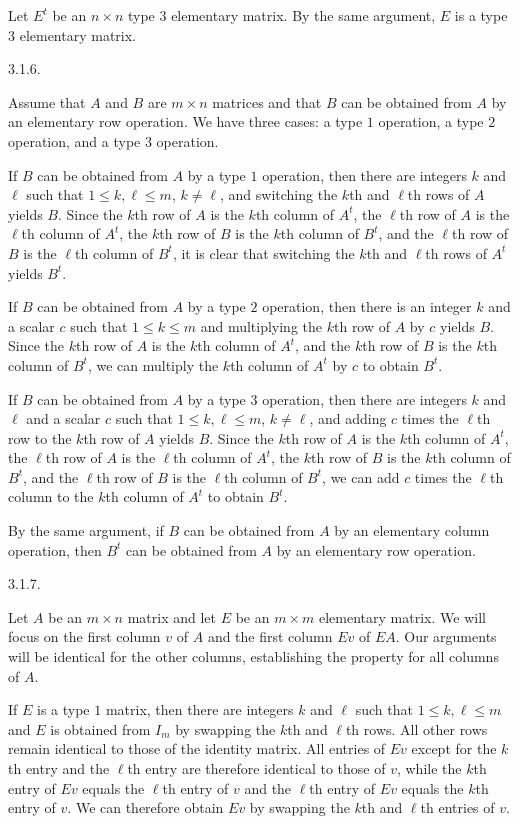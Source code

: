 Let $E^t$ be an $n \times n$ type $3$ elementary matrix.
By the same argument, $E$ is a type $3$ elementary matrix.
\bigskip
\item{3.1.6.}

Assume that $A$ and $B$ are $m \times n$ matrices
and that $B$ can be obtained from $A$ by an elementary row operation.
We have three cases: a type $1$ operation, a type $2$ operation,
and a type $3$ operation.

If $B$ can be obtained from $A$ by a type $1$ operation,
then there are integers $k$ and $\ell$ such that
$1 \le k,\ell \le m$, $k \ne \ell$,
and switching the $k$th and $\ell$th rows of $A$ yields $B$.
Since the $k$th row of $A$ is the $k$th column of $A^t$,
the $\ell$th row of $A$ is the $\ell$th column of $A^t$,
the $k$th row of $B$ is the $k$th column of $B^t$,
and the $\ell$th row of $B$ is the $\ell$th column of $B^t$,
it is clear that switching the $k$th and $\ell$th rows of $A^t$ yields $B^t$.

If $B$ can be obtained from $A$ by a type $2$ operation,
then there is an integer $k$ and a scalar $c$ such that $1 \le k \le m$
and multiplying the $k$th row of $A$ by $c$ yields $B$.
Since the $k$th row of $A$ is the $k$th column of $A^t$,
and the $k$th row of $B$ is the $k$th column of $B^t$,
we can multiply the $k$th column of $A^t$ by $c$ to obtain $B^t$.

If $B$ can be obtained from $A$ by a type $3$ operation,
then there are integers $k$ and $\ell$ and a scalar $c$ such that
$1 \le k,\ell \le m$, $k \ne \ell$, and
adding $c$ times the $\ell$th row to the $k$th row of $A$ yields $B$.
Since the $k$th row of $A$ is the $k$th column of $A^t$,
the $\ell$th row of $A$ is the $\ell$th column of $A^t$,
the $k$th row of $B$ is the $k$th column of $B^t$,
and the $\ell$th row of $B$ is the $\ell$th column of $B^t$,
we can add $c$ times the $\ell$th column
to the $k$th column of $A^t$ to obtain $B^t$.

By the same argument, if $B$ can be obtained from $A$
by an elementary column operation,
then $B^t$ can be obtained from $A$ by an elementary row operation.
\item{3.1.7.}

Let $A$ be an $m \times n$ matrix and
let $E$ be an $m \times m$ elementary matrix.
We will focus on the first column $v$ of $A$
and the first column $Ev$ of $EA$.
Our arguments will be identical for the other columns,
establishing the property for all columns of $A$.

If $E$ is a type $1$ matrix,
then there are integers $k$ and $\ell$ such that $1 \le k,\ell \le m$
and $E$ is obtained from $I_m$ by swapping the $k$th and $\ell$th rows.
All other rows remain identical to those of the identity matrix.
All entries of $Ev$ except for the $k$th entry and the $\ell$th entry
are therefore identical to those of $v$,
while the $k$th entry of $Ev$ equals the $\ell$th entry of $v$
and the $\ell$th entry of $Ev$ equals the $k$th entry of $v$.
We can therefore obtain $Ev$ by swapping
the $k$th and $\ell$th entries of $v$.

